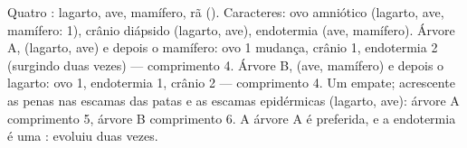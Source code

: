 \begin{example}\label{ex:b1:classifying-biodiversity:count}
Quatro : lagarto, ave, mamífero, rã (). Caracteres:
ovo amniótico (lagarto, ave, mamífero: 1), crânio diápsido (lagarto,
ave), endotermia (ave, mamífero). Árvore A, (lagarto, ave) e depois o
mamífero: ovo 1 mudança, crânio 1, endotermia 2 (surgindo duas vezes)
--- comprimento 4. Árvore B, (ave, mamífero) e depois o lagarto: ovo
1, endotermia 1, crânio 2 --- comprimento 4. Um empate; acrescente as
penas nas escamas das patas e as escamas epidérmicas (lagarto, ave):
árvore A comprimento 5, árvore B comprimento 6. A árvore A é
preferida, e a endotermia é uma : evoluiu duas vezes.
\end{example}

